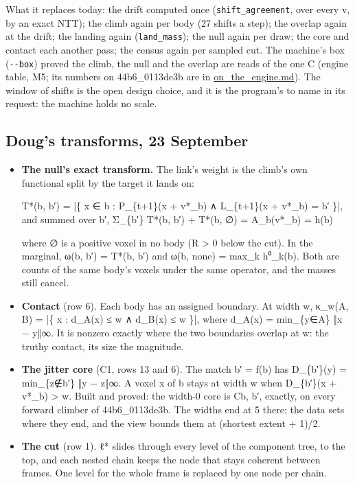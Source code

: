 What it replaces today: the drift computed once (\texttt{shift\_\allowbreak{}agreement}, over every v, by an exact NTT); the climb again per body (27 shifts a step); the overlap again at the drift; the landing again (\texttt{land\_\allowbreak{}mass}); the null again per draw; the core and contact each another pass; the census again per sampled cut. The machine's box (\texttt{-\allowbreak{}-\allowbreak{}box}) proved the climb, the null and the overlap are reads of the one C (engine table, M5; its numbers on 44b6\_\allowbreak{}0113de3b are in \hyperref[chap:on-the-engine]{on\_\allowbreak{}the\_\allowbreak{}engine.md}). The window of shifts is the open design choice, and it is the program's to name in its request: the machine holds no scale.

\subsection{\texorpdfstring{Doug's transforms, 23 September}{Doug's transforms, 23 September}}

\begin{itemize}
\item \textbf{The null's exact transform.} The link's weight is the climb's own functional split by the target it lands on:

T*(b, b′) = |\{ x ∈ b : P\_\allowbreak{}\{t+1\}(x + v*\_\allowbreak{}b) ∧ L\_\allowbreak{}\{t+1\}(x + v*\_\allowbreak{}b) = b′ \}|,  and summed over b′, Σ\_\allowbreak{}\{b′\} T*(b, b′) + T*(b, ∅) = A\_\allowbreak{}b(v*\_\allowbreak{}b) = h(b)

where ∅ is a positive voxel in no body (R > 0 below the cut). In the marginal, ω(b, b′) = T*(b, b′) and ω(b, none) = max\_\allowbreak{}k h⁰\_\allowbreak{}k(b). Both are counts of the same body's voxels under the same operator, and the masses still cancel.
\item \textbf{Contact} (row 6). Each body has an assigned boundary. At width w, κ\_\allowbreak{}w(A, B) = |\{ x : d\_\allowbreak{}A(x) ≤ w ∧ d\_\allowbreak{}B(x) ≤ w \}|, where d\_\allowbreak{}A(x) = min\_\allowbreak{}\{y∈A\} ‖x − y‖∞. It is nonzero exactly where the two boundaries overlap at w: the truthy contact, its size the magnitude.
\item \textbf{The jitter core} (C1, rows 13 and 6). The match b′ = f(b) has D\_\allowbreak{}\{b′\}(y) = min\_\allowbreak{}\{z∉b′\} ‖y − z‖∞. A voxel x of b stays at width w when D\_\allowbreak{}\{b′\}(x + v*\_\allowbreak{}b) > w. Built and proved: the width-0 core is Cb, b′, exactly, on every forward climber of 44b6\_\allowbreak{}0113de3b. The widths end at 5 there; the data sets where they end, and the view bounds them at (shortest extent + 1)/2.
\item \textbf{The cut} (row 1). ℓ* slides through every level of the component tree, to the top, and each nested chain keeps the node that stays coherent between frames. One level for the whole frame is replaced by one node per chain.
\end{itemize}

